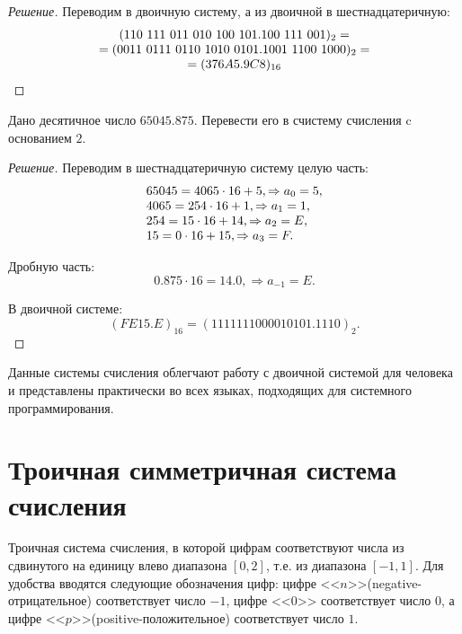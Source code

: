 \begin{proof}[Решение]
    Переводим в двоичную систему, а из двоичной в шестнадцатеричную:
    \[
        \begin{array}[c]{c}
            (110\ 111\ 011\ 010\ 100\ 101.100\ 111\ 001)_2=\\
            =(0011\ 0111\ 0110\ 1010\ 0101.1001\ 1100\ 1000)_2=\\
            =(376A5.9C8)_{16}
        \end{array}
    \]
\end{proof}

\begin{exampl}[Задача]
    Дано десятичное число $65045.875$. Перевести его в счистему счисления c основанием $2$.
\end{exampl}
\begin{proof}[Решение]
    Переводим в шестнадцатеричную систему целую часть:
    \[
        \begin{array}[c]{l}
            65045=4065\cdot 16 + 5,\Rightarrow a_{0}=5, \\
            4065=254\cdot 16 + 1,\Rightarrow a_{1}=1, \\
            254=15\cdot 16 + 14,\Rightarrow a_{2}=E, \\
            15=0\cdot 16 + 15,\Rightarrow a_{3}=F.
        \end{array}
    \]

    Дробную часть:
    \[
        0.875\cdot 16=14.0,\Rightarrow a_{-1}=E.
    \]

    В двоичной системе:
    \[(FE15.E)_{16}=(1111111000010101.1110)_2.\]
\end{proof}

Данные системы счисления облегчают работу с двоичной системой для человека и представлены практически во всех языках, подходящих для системного программирования.


\section{Троичная симметричная система счисления}
\label{s:ch:ss:triplet}

Троичная система счисления, в которой цифрам соответствуют числа из сдвинутого на единицу влево диапазона $[0,2]$, т.е. из диапазона $[-1,1]$. Для удобства вводятся следующие обозначения цифр: цифре <<$n$>>(negative-отрицательное) соответствует число $-1$, цифре <<$0$>> соответствует число $0$, а цифре <<$p$>>(positive-положительное) соответствует число $1$.

